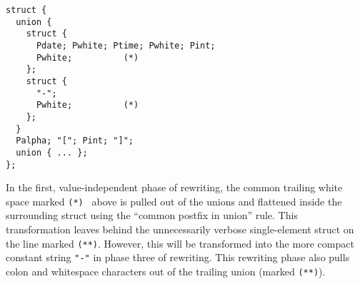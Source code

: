 {\small
\begin{verbatim}
struct {
  union {
    struct {
      Pdate; Pwhite; Ptime; Pwhite; Pint;  
      Pwhite;          (*)
    };
    struct { 
      "-"; 
      Pwhite;          (*)
    };
  }
  Palpha; "["; Pint; "]";
  union { ... };
};
\end{verbatim}
}





In the first, value-independent phase of rewriting, 
the common trailing white space marked {\tt (*) } above is
pulled out of the unions and flattened inside the surrounding
struct using the ``common postfix in union'' rule.  This 
transformation leaves behind the unnecessarily verbose
single-element struct on the line marked {\tt (**)}.  However, this
will be transformed into the more compact constant 
string {\tt "-"} in phase three of rewriting.  This rewriting
phase also pulls colon and whitespace characters out of the 
trailing union (marked {\tt (**)}).

